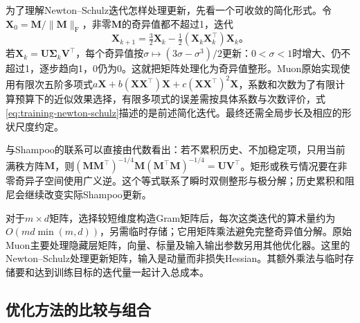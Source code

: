 为了理解Newton--Schulz迭代怎样处理更新，先看一个可收敛的简化形式。令$\bm X_0=\bm M/\lVert\bm M\rVert_{\mathrm F}$，非零$\bm M$的奇异值都不超过1，迭代
\begin{equation}
  \bm X_{k+1}=\tfrac32\bm X_k-
             \tfrac12(\bm X_k\bm X_k^{\top})\bm X_k\text{。}
  \label{eq:training-newton-schulz}
\end{equation}
若$\bm X_k=\bm U\bm\Sigma_k\bm V^{\top}$，每个奇异值按$\sigma\mapsto(3\sigma-\sigma^3)/2$更新：$0<\sigma<1$时增大、仍不超过1，逐步趋向1，0仍为0。这就把矩阵处理化为奇异值整形。Muon原始实现使用有限次五阶多项式$a\bm X+b(\bm X\bm X^{\top})\bm X+c(\bm X\bm X^{\top})^2\bm X$，系数和次数为了有限计算预算下的近似效果选择，有限多项式的误差需按具体系数与次数评价，式\eqref{eq:training-newton-schulz}描述的是前述简化迭代。最终还需全局步长及相应的形状尺度约定。

与Shampoo的联系可以直接由代数看出：若不累积历史、不加稳定项，只用当前满秩方阵$\bm M$，则$(\bm M\bm M^{\top})^{-1/4}\bm M(\bm M^{\top}\bm M)^{-1/4}=\bm U\bm V^{\top}$。矩形或秩亏情况要在非零奇异子空间使用广义逆。这个等式联系了瞬时双侧整形与极分解；历史累积和阻尼会继续改变实际Shampoo更新。

对于$m\times d$矩阵，选择较短维度构造Gram矩阵后，每次这类迭代的算术量约为$O(md\min(m,d))$，另需临时存储；它用矩阵乘法避免完整奇异值分解。原始Muon主要处理隐藏层矩阵，向量、标量及输入输出参数另用其他优化器。这里的Newton--Schulz处理更新矩阵，输入是动量而非损失Hessian。其额外乘法与临时存储要和达到训练目标的迭代量一起计入总成本。

\subsection{优化方法的比较与组合}
\label{sec:training-optimizer-comparison}

